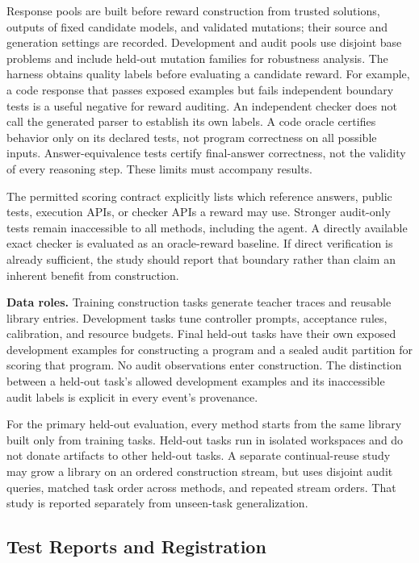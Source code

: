 Response pools are built before reward construction from trusted solutions, outputs of fixed candidate models, and validated mutations; their source and generation settings are recorded. Development and audit pools use disjoint base problems and include held-out mutation families for robustness analysis. The harness obtains quality labels before evaluating a candidate reward. For example, a code response that passes exposed examples but fails independent boundary tests is a useful negative for reward auditing. An independent checker does not call the generated parser to establish its own labels. A code oracle certifies behavior only on its declared tests, not program correctness on all possible inputs. Answer-equivalence tests certify final-answer correctness, not the validity of every reasoning step. These limits must accompany results.

The permitted scoring contract explicitly lists which reference answers, public tests, execution APIs, or checker APIs a reward may use. Stronger audit-only tests remain inaccessible to all methods, including the agent. A directly available exact checker is evaluated as an oracle-reward baseline. If direct verification is already sufficient, the study should report that boundary rather than claim an inherent benefit from construction.

\noindent\textbf{Data roles.} Training construction tasks generate teacher traces and reusable library entries. Development tasks tune controller prompts, acceptance rules, calibration, and resource budgets. Final held-out tasks have their own exposed development examples for constructing a program and a sealed audit partition for scoring that program. No audit observations enter construction. The distinction between a held-out task's allowed development examples and its inaccessible audit labels is explicit in every event's provenance.

For the primary held-out evaluation, every method starts from the same library built only from training tasks. Held-out tasks run in isolated workspaces and do not donate artifacts to other held-out tasks. A separate continual-reuse study may grow a library on an ordered construction stream, but uses disjoint audit queries, matched task order across methods, and repeated stream orders. That study is reported separately from unseen-task generalization.

\subsection{Test Reports and Registration}

